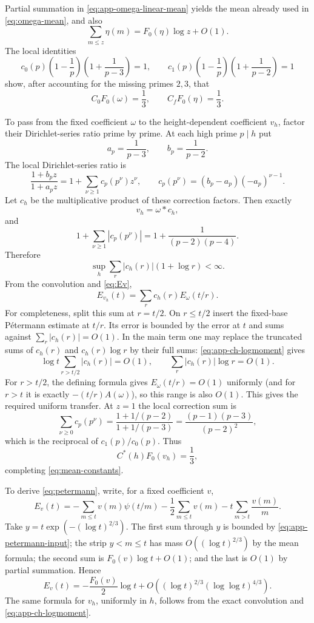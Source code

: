 \documentclass[11pt]{article}
\theoremstyle{definition}
\theoremstyle{remark}
\newcommand{\1}{\mathbf 1}
\newcommand{\om}{\omega}
\begin{document}
Partial summation in \cref{eq:app-omega-linear-mean} yields the mean already used in \cref{eq:omega-mean}, and also
\[
\sum_{m\le z}\eta(m)=F_0(\eta)\log z+O(1).
\]
The local identities
\[
c_0(p)\left(1-\frac1p\right)\left(1+\frac1{p-3}\right)=1,
\qquad
c_1(p)\left(1-\frac1p\right)\left(1+\frac1{p-2}\right)=1
\]
show, after accounting for the missing primes $2,3$, that
\[
C_0F_0(\om)=\frac13,
\qquad C_fF_0(\eta)=\frac13.
\]

To pass from the fixed coefficient $\om$ to the height-dependent coefficient $v_h$, factor their Dirichlet-series ratio prime by prime.  At each high prime $p\mid h$ put
\[
a_p=\frac1{p-3},\qquad b_p=\frac1{p-2}.
\]
The local Dirichlet-series ratio is
\[
\frac{1+b_pz}{1+a_pz}
=1+\sum_{\nu\ge1}c_p(p^\nu)z^\nu,
\qquad
c_p(p^\nu)=(b_p-a_p)(-a_p)^{\nu-1}.
\]
Let $c_h$ be the multiplicative product of these correction factors.  Then exactly
\[
v_h=\om*c_h,
\]
and
\[
1+\sum_{\nu\ge1}|c_p(p^\nu)|
=1+\frac1{(p-2)(p-4)}.
\]
Therefore
\begin{equation}\label{eq:app-ch-logmoment}
\sup_h\sum_r|c_h(r)|(1+\log r)<\infty.
\end{equation}
From the convolution and \cref{eq:Ev},
\[
E_{v_h}(t)=\sum_rc_h(r)E_\om(t/r).
\]
For completeness, split this sum at $r=t/2$.  On $r\le t/2$ insert the
fixed-base P\'etermann estimate at $t/r$.  Its error is bounded by the error
at $t$ and sums against $\sum_r|c_h(r)|=O(1)$.  In the main term one may
replace the truncated sums of $c_h(r)$ and $c_h(r)\log r$ by their full sums:
\cref{eq:app-ch-logmoment} gives
\[
\log t\sum_{r>t/2}|c_h(r)|=O(1),
\qquad
\sum_r|c_h(r)|\log r=O(1).
\]
For $r>t/2$, the defining formula gives $E_\om(t/r)=O(1)$ uniformly (and for
$r>t$ it is exactly $-(t/r)A(\om)$), so this range is also $O(1)$.  This gives the required uniform transfer.  At $z=1$ the local correction sum is
\[
\sum_{\nu\ge0}c_p(p^\nu)
=\frac{1+1/(p-2)}{1+1/(p-3)}
=\frac{(p-1)(p-3)}{(p-2)^2},
\]
which is the reciprocal of $c_1(p)/c_0(p)$.  Thus
\[
C^*(h)F_0(v_h)=\frac13,
\]
completing \cref{eq:mean-constants}.

To derive \cref{eq:petermann}, write, for a fixed coefficient $v$,
\[
E_v(t)
=-\sum_{m\le t}v(m)\psi(t/m)
 -\frac12\sum_{m\le t}v(m)
 -t\sum_{m>t}\frac{v(m)}m.
\]
Take $y=t\exp(- (\log t)^{2/3})$.  The first sum through $y$ is bounded by \cref{eq:app-petermann-input}; the strip $y<m\le t$ has mass $O((\log t)^{2/3})$ by the mean formula; the second sum is $F_0(v)\log t+O(1)$; and the last is $O(1)$ by partial summation.  Hence
\[
E_v(t)=-\frac{F_0(v)}2\log t
+O((\log t)^{2/3}(\log\log t)^{4/3}).
\]
The same formula for $v_h$, uniformly in $h$, follows from the exact convolution and \cref{eq:app-ch-logmoment}.
\end{document}
